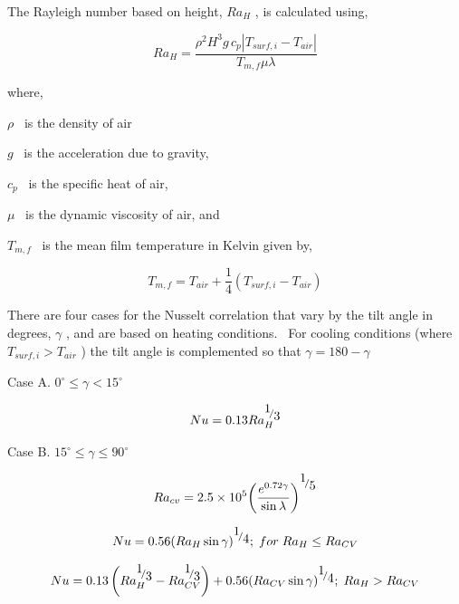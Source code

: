 The Rayleigh number based on height, \(R{a_H}\) , is calculated using,

\begin{equation}
R{a_H} = \frac{{{\rho ^2}{H^3}g\,{c_p}\left| {{T_{surf,i}} - {T_{air}}} \right|}}{{{T_{m,f}}\mu \lambda }}
\end{equation}

where,

\(\rho\) ~is the density of air

\(g\) ~is the acceleration due to gravity,

\({c_p}\) ~is the specific heat of air,

\(\mu\) ~is the dynamic viscosity of air, and

\({T_{m,f}}\) ~is the mean film temperature in Kelvin given by,

\begin{equation}
{T_{m,f}} = {T_{air}} + \frac{1}{4}\left( {{T_{surf,i}} - {T_{air}}} \right)
\end{equation}

There are four cases for the Nusselt correlation that vary by the tilt angle in degrees, \(\gamma\) , and are based on heating conditions.~ For cooling conditions (where \({T_{surf,i}} > {T_{air}}\) ) the tilt angle is complemented so that \(\gamma = 180 - \gamma\)

Case A. \({0^\circ } \le \gamma < 15^\circ\)

\begin{equation}
Nu = 0.13Ra_H^{{\raise0.7ex\hbox{1} \!\mathord{\left/ {\vphantom {1 3}}\right.}\!\lower0.7ex\hbox{3}}}
\end{equation}

Case B. \(15^\circ \le \gamma \le 90^\circ\)

\begin{equation}
R{a_{cv}} = 2.5 \times {10^5}{\left( {\frac{{{e^{0.72\gamma }}}}{{\sin \lambda }}} \right)^{{\raise0.7ex\hbox{1} \!\mathord{\left/ {\vphantom {1 5}}\right.}\!\lower0.7ex\hbox{5}}}}
\end{equation}

\begin{equation}
Nu = 0.56{\left( {R{a_H}\sin \gamma } \right)^{{\raise0.7ex\hbox{1} \!\mathord{\left/ {\vphantom {1 4}}\right.}\!\lower0.7ex\hbox{4}}}};\;for\;R{a_H} \le R{a_{CV}}
\end{equation}

\begin{equation}
Nu = 0.13\left( {Ra_H^{{\raise0.7ex\hbox{1} \!\mathord{\left/ {\vphantom {1 3}}\right.}\!\lower0.7ex\hbox{3}}} - Ra_{CV}^{{\raise0.7ex\hbox{1} \!\mathord{\left/ {\vphantom {1 3}}\right.}\!\lower0.7ex\hbox{3}}}} \right) + 0.56{\left( {R{a_{CV}}\sin \gamma } \right)^{{\raise0.7ex\hbox{1} \!\mathord{\left/ {\vphantom {1 4}}\right.}\!\lower0.7ex\hbox{4}}}};\;R{a_H} > R{a_{CV}}
\end{equation}

